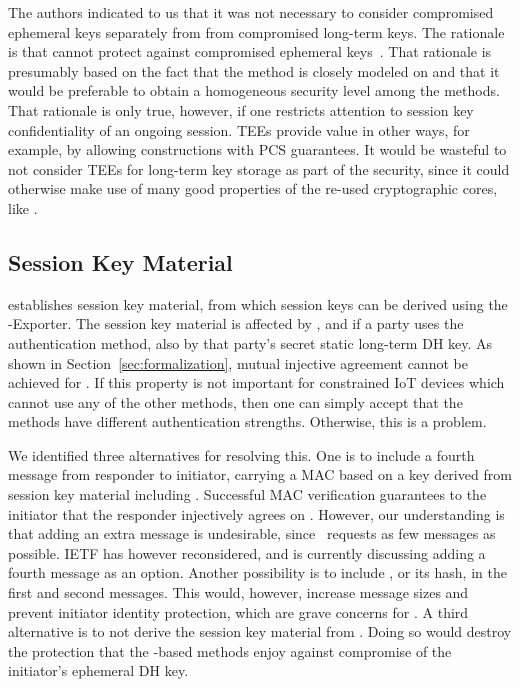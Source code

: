 \documentclass[runningheads, envcountsame, hidelinks, a4paper, draft, x11names]{llncs}
\begin{document}
The \mEdhoc{} authors indicated to us that it was
not necessary to consider compromised ephemeral keys separately from
from compromised long-term keys.
%
The rationale is that \mSigma{} cannot protect against compromised ephemeral
keys~\cite{personalCommunication}.
%
That rationale is presumably based on the fact that the \mSigSig{} method is
closely modeled on \mSigmaI{} and that it would be preferable to obtain a
homogeneous security level among the \mEdhoc{}
methods.
%
That rationale is only true, however, if one restricts attention to session key
confidentiality of an ongoing session.
%
TEEs provide value in other ways, for example, by allowing constructions with
PCS guarantees.
%
It would be wasteful to not consider TEEs for long-term key storage as part of
the security, since it could otherwise make use of many good properties of the
re-used cryptographic cores, like \mOptls.
%
%

\subsection{Session Key Material}
\label{sec:sessionKeyMaterial}
\mEdhoc{} establishes session key material, from which session keys
can be derived using the \mEdhoc{}-Exporter.
%
The session key material is affected by \mGxy{}, and if a party uses the
\mStat{} authentication method, also by that party's secret static long-term DH key.
%
As shown in Section~\ref{sec:formalization}, mutual injective agreement cannot
be achieved for \mGiy{}.
%
If this property is not important for constrained IoT devices which cannot use
any of the other methods, then one can simply accept that the methods have
different authentication strengths.
%
Otherwise, this is a problem.
%

We identified three alternatives for resolving this.
%
One is to include a fourth message from responder to initiator,
carrying a MAC based on a key derived from session key
material including \mGiy{}.
%
Successful MAC verification guarantees
to the initiator that the responder injectively agrees on \mGiy{}.
%
However, our understanding is that adding an extra message is
undesirable, since~\cite{our-analysis-selander-lake-edhoc-00} requests as few messages as
possible.
%
IETF has however reconsidered, and is currently discussing adding a fourth
message as an option.
%
Another possibility is to include \mGi{}, or its hash, in the first and
second messages.
%
This would, however, increase message sizes and prevent initiator identity
protection, which are grave concerns for \mEdhoc{}.
%
A third alternative is to not derive the session key material from \mGiy.
%
Doing so would destroy the protection that the \mStat-based methods enjoy against compromise
of the initiator's ephemeral DH key.
%
\end{document}
